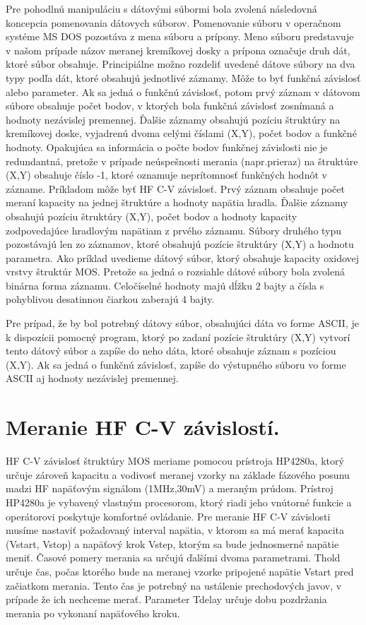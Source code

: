 Pre pohodlnú manipuláciu s dátovými súbormi bola zvolená následovná
koncepcia pomenovania dátovych súborov. Pomenovanie súboru v operačnom
systéme MS DOS pozostáva z mena súboru a prípony.  Meno súboru
predstavuje v našom prípade názov meranej kremíkovej dosky a prípona
označuje druh dát, ktoré súbor obsahuje. Principiálne možno rozdeliť
uvedené dátove súbory na dva typy podľa dát, ktoré obsahujú jednotlivé
záznamy. Môže to byť funkčná závislosť alebo parameter. Ak sa jedná o
funkčnú závislosť, potom prvý záznam v dátovom súbore obsahuje počet
bodov, v ktorých bola funkčná závislosť zosnímaná a hodnoty nezávislej
premennej. Ďalšie záznamy obsahujú pozíciu štruktúry na kremíkovej
doske, vyjadrenú dvoma celými číslami (X,Y), počet bodov a funkčné
hodnoty.  Opakujúca sa informácia o počte bodov funkčnej závislosti
nie je redundantná, pretože v prípade neúspešnosti merania
(napr.prieraz) na štruktúre (X,Y) obsahuje číslo -1, ktoré oznamuje
neprítomnosť funkčných hodnôt v zázname. Príkladom môže byť HF C-V
závislosť. Prvý záznam obsahuje počet meraní kapacity na jednej
štruktúre a hodnoty napätia hradla. Ďalšie záznamy obsahujú pozíciu
štruktúry (X,Y), počet bodov a hodnoty kapacity zodpovedajúce
hradlovým napätiam z prvého záznamu. Súbory druhého typu pozostávajú
len zo záznamov, ktoré obsahujú pozície štruktúry (X,Y) a hodnotu
parametra. Ako príklad uvedieme dátový súbor, ktorý obsahuje kapacity
oxidovej vrstvy štruktúr MOS\@. Pretože sa jedná o rozsiahle dátové
súbory bola zvolená binárna forma záznamu.  Celočíselné hodnoty majú
dĺžku 2 bajty a čísla s pohyblivou desatinnou čiarkou zaberajú 4
bajty.

Pre prípad, že by bol potrebný dátovy súbor, obsahujúci dáta vo forme
ASCII, je k dispozícii pomocný program, ktorý po zadaní pozície
štruktúry (X,Y) vytvorí tento dátový súbor a zapíše do neho dáta,
ktoré obsahuje záznam s pozíciou (X,Y). Ak sa jedná o funkčnú
závislosť, zapíše do výstupného súboru vo forme ASCII aj hodnoty
nezávislej premennej.

\section{Meranie HF C-V závislostí.}\label{sec:5.1}

HF C-V závislosť štruktúry MOS meriame pomocou prístroja HP4280a,
ktorý určuje zároveň kapacitu a vodivosť meranej vzorky na základe
fázového posunu madzi HF napäťovým signálom (1MHz,30mV) a meraným
prúdom. Prístroj HP4280a je vybavený vlastným procesorom, ktorý riadi
jeho vnútorné funkcie a operátorovi poskytuje komfortné ovládanie. Pre
meranie HF C-V závislosti musíme nastaviť požadovaný interval napätia,
v ktorom sa má merať kapacita (Vstart, Vstop) a napäťový krok Vstep,
ktorým sa bude jednosmerné napätie meniť. Časové pomery merania sa
určujú ďalšími dvoma parametrami. Thold určuje čas, počas ktorého bude
na meranej vzorke pripojené napätie Vstart pred začiatkom
merania. Tento čas je potrebný na ustálenie prechodových javov, v
prípade že ich nechceme merať. Parameter Tdelay určuje dobu pozdržania
merania po vykonaní napäťového kroku.

